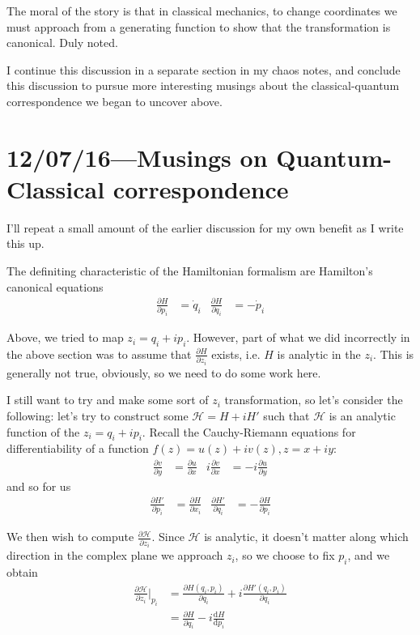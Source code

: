 \documentclass[12pt]{report}
\newcommand{\rd}[2]{\frac{\mathrm{d}#1}{\mathrm{d}#2}}
\newcommand{\pd}[2]{\frac{\partial#1}{\partial#2}}
\begin{document}
The moral of the story is that in classical mechanics, to change coordinates we
must approach from a generating function to show that the transformation is
canonical. Duly noted.

I continue this discussion in a separate section in my chaos notes, and conclude
this discussion to pursue more interesting musings about the classical-quantum
correspondence we began to uncover above.

\clearpage

\chapter{12/07/16---Musings on Quantum-Classical correspondence}

I'll repeat a small amount of the earlier discussion for my own benefit as I
write this up.

The definiting characteristic of the Hamiltonian formalism are Hamilton's
canonical equations
\begin{align}
    \pd{H}{p_i} &= \dot{q}_i & \pd{H}{q_i} &= -\dot{p}_i
\end{align}

Above, we tried to map $z_i = q_i + ip_i$. However, part of what we did
incorrectly in the above section was to assume that $\pd{H}{z_i}$ exists, i.e.
$H$ is analytic in the $z_i$. This is generally not true, obviously, so we need
to do some work here.

I still want to try and make some sort of $z_i$ transformation, so let's
consider the following: let's try to construct some $\mathcal{H} = H + iH'$ such
that $\mathcal{H}$ is an analytic function of the $z_i = q_i + ip_i$. Recall the
Cauchy-Riemann equations for differentiability of a function $f(z) = u(z) +
iv(z), z = x + iy$:
\begin{align}
    \pd{v}{y} &= \pd{u}{x}& i\pd{v}{x} &= -i\pd{u}{y}
\end{align}
and so for us
\begin{align}
    \pd{H'}{p_i} &= \pd{H}{x_i}& \pd{H'}{q_i} &= -\pd{H}{p_i}
\end{align}

We then wish to compute $\pd{\mathcal{H}}{z_i}$. Since $\mathcal{H}$ is
analytic, it doesn't matter along which direction in the complex plane we
approach $z_i$, so we choose to fix $p_i$, and we obtain
\begin{align}
    \pd{\mathcal{H}}{z_i}\Bigg|_{p_i} &=
        \pd{H(q_i, p_i)}{q_i} + i\pd{H'(q_i, p_i)}{q_i}\\
        &= \pd{H}{q_i} - i\rd{H}{p_i}
\end{align}
\end{document}
